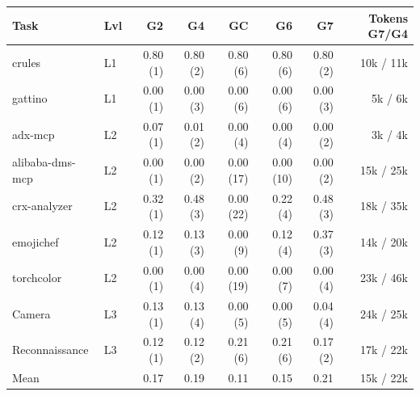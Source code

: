 \begin{tabular}{@{}llrrrrrr@{}}
\toprule
Task & Lvl & G2 & G4 & GC & G6 & G7 & Tokens G7/G4 \\
\midrule
crules & L1 & 0.80 (1) & 0.80 (2) & 0.80 (6) & 0.80 (6) & 0.80 (2) & 10k / 11k \\
gattino & L1 & 0.00 (1) & 0.00 (3) & 0.00 (6) & 0.00 (6) & 0.00 (3) & 5k / 6k \\
adx-mcp & L2 & 0.07 (1) & 0.01 (2) & 0.00 (4) & 0.00 (4) & 0.00 (2) & 3k / 4k \\
alibaba-dms-mcp & L2 & 0.00 (1) & 0.00 (2) & 0.00 (17) & 0.00 (10) & 0.00 (2) & 15k / 25k \\
crx-analyzer & L2 & 0.32 (1) & 0.48 (3) & 0.00 (22) & 0.22 (4) & 0.48 (3) & 18k / 35k \\
emojichef & L2 & 0.12 (1) & 0.13 (3) & 0.00 (9) & 0.12 (4) & 0.37 (3) & 14k / 20k \\
torchcolor & L2 & 0.00 (1) & 0.00 (4) & 0.00 (19) & 0.00 (7) & 0.00 (4) & 23k / 46k \\
Camera & L3 & 0.13 (1) & 0.13 (4) & 0.00 (5) & 0.00 (5) & 0.04 (4) & 24k / 25k \\
Reconnaissance & L3 & 0.12 (1) & 0.12 (2) & 0.21 (6) & 0.21 (6) & 0.17 (2) & 17k / 22k \\
\midrule
Mean &  & 0.17 & 0.19 & 0.11 & 0.15 & 0.21 & 15k / 22k \\
\bottomrule
\end{tabular}
